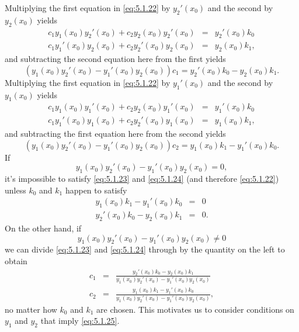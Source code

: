 \documentclass{ximera}
\begin{document}
Multiplying the first equation in \eqref{eq:5.1.22} by $y_2'(x_0)$
and the second by $y_2(x_0)$ yields
\begin{eqnarray*}
c_1y_1(x_0)y_2'(x_0)+c_2y_2(x_0)y_2'(x_0)&=& y_2'(x_0)k_0\\
c_1y_1'(x_0)y_2(x_0)+c_2y_2'(x_0)y_2(x_0)&=& y_2(x_0)k_1,
\end{eqnarray*}
and subtracting the second equation here from the first yields
\begin{equation}\label{eq:5.1.23}
\left(y_1(x_0)y_2'(x_0)-y_1'(x_0)y_2(x_0)\right)c_1=
y_2'(x_0)k_0-y_2(x_0)k_1.
\end{equation}
Multiplying the first equation in \eqref{eq:5.1.22} by $y_1'(x_0)$
and the second by $y_1(x_0)$ yields
\begin{eqnarray*}
c_1y_1(x_0)y_1'(x_0)+c_2y_2(x_0)y_1'(x_0)&=& y_1'(x_0)k_0\\
c_1y_1'(x_0)y_1(x_0)+c_2y_2'(x_0)y_1(x_0)&=& y_1(x_0)k_1,
\end{eqnarray*}
and subtracting the first equation here from the second yields
\begin{equation}\label{eq:5.1.24}
\left(y_1(x_0)y_2'(x_0)-y_1'(x_0)y_2(x_0)\right)c_2=
y_1(x_0)k_1-y_1'(x_0)k_0.
\end{equation}
If
$$
y_1(x_0)y_2'(x_0)-y_1'(x_0)y_2(x_0)=0,
$$
 it's impossible to satisfy \eqref{eq:5.1.23} and \eqref{eq:5.1.24}
(and therefore \eqref{eq:5.1.22})
unless $k_0$ and $k_1$ happen to satisfy
\begin{eqnarray*}
y_1(x_0)k_1-y_1'(x_0)k_0&=&0\\
y_2'(x_0)k_0-y_2(x_0)k_1&=&0.
\end{eqnarray*}
On the other hand, if
\begin{equation}\label{eq:5.1.25}
y_1(x_0)y_2'(x_0)-y_1'(x_0)y_2(x_0)\ne0
\end{equation}
 we can  divide \eqref{eq:5.1.23} and \eqref{eq:5.1.24} through by the
quantity on the left  to obtain
\begin{equation}\label{eq:5.1.26}
\begin{array}{rcl}
c_1&=&\frac{y_2'(x_0)k_0-y_2(x_0)k_1}
{y_1(x_0)y_2'(x_0)-y_1'(x_0)y_2(x_0)}\\
c_2&=&\frac{y_1(x_0)k_1-y_1'(x_0)k_0}
{y_1(x_0)y_2'(x_0)-y_1'(x_0)y_2(x_0)},
\end{array}
\end{equation}
no matter how $k_0$ and $k_1$ are chosen. This motivates us to
consider conditions on $y_1$ and $y_2$ that imply \eqref{eq:5.1.25}.
\end{document}
